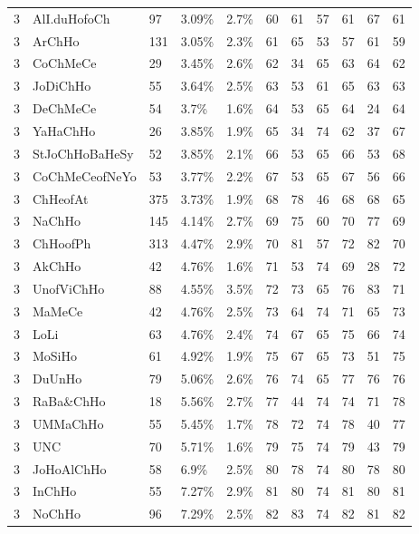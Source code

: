 \begin{longtable}{lllllrrrrrr}
  3 & AlI.duHofoCh & 97 & 3.09\% & 2.7\% &  60 &  61 &  57 &  61 &  67 &  61 \\ 
  3 & ArChHo & 131 & 3.05\% & 2.3\% &  61 &  65 &  53 &  57 &  61 &  59 \\ 
  3 & CoChMeCe & 29 & 3.45\% & 2.6\% &  62 &  34 &  65 &  63 &  64 &  62 \\ 
  3 & JoDiChHo & 55 & 3.64\% & 2.5\% &  63 &  53 &  61 &  65 &  63 &  63 \\ 
  3 & DeChMeCe & 54 & 3.7\% & 1.6\% &  64 &  53 &  65 &  64 &  24 &  64 \\ 
  3 & YaHaChHo & 26 & 3.85\% & 1.9\% &  65 &  34 &  74 &  62 &  37 &  67 \\ 
  3 & StJoChHoBaHeSy & 52 & 3.85\% & 2.1\% &  66 &  53 &  65 &  66 &  53 &  68 \\ 
  3 & CoChMeCeofNeYo & 53 & 3.77\% & 2.2\% &  67 &  53 &  65 &  67 &  56 &  66 \\ 
  3 & ChHeofAt & 375 & 3.73\% & 1.9\% &  68 &  78 &  46 &  68 &  68 &  65 \\ 
  3 & NaChHo & 145 & 4.14\% & 2.7\% &  69 &  75 &  60 &  70 &  77 &  69 \\ 
  3 & ChHoofPh & 313 & 4.47\% & 2.9\% &  70 &  81 &  57 &  72 &  82 &  70 \\ 
  3 & AkChHo & 42 & 4.76\% & 1.6\% &  71 &  53 &  74 &  69 &  28 &  72 \\ 
  3 & UnofViChHo & 88 & 4.55\% & 3.5\% &  72 &  73 &  65 &  76 &  83 &  71 \\ 
  3 & MaMeCe & 42 & 4.76\% & 2.5\% &  73 &  64 &  74 &  71 &  65 &  73 \\ 
  3 & LoLi & 63 & 4.76\% & 2.4\% &  74 &  67 &  65 &  75 &  66 &  74 \\ 
  3 & MoSiHo & 61 & 4.92\% & 1.9\% &  75 &  67 &  65 &  73 &  51 &  75 \\ 
  3 & DuUnHo & 79 & 5.06\% & 2.6\% &  76 &  74 &  65 &  77 &  76 &  76 \\ 
  3 & RaBa\&ChHo & 18 & 5.56\% & 2.7\% &  77 &  44 &  74 &  74 &  71 &  78 \\ 
  3 & UMMaChHo & 55 & 5.45\% & 1.7\% &  78 &  72 &  74 &  78 &  40 &  77 \\ 
  3 & UNC & 70 & 5.71\% & 1.6\% &  79 &  75 &  74 &  79 &  43 &  79 \\ 
  3 & JoHoAlChHo & 58 & 6.9\% & 2.5\% &  80 &  78 &  74 &  80 &  78 &  80 \\ 
  3 & InChHo & 55 & 7.27\% & 2.9\% &  81 &  80 &  74 &  81 &  80 &  81 \\ 
  3 & NoChHo & 96 & 7.29\% & 2.5\% &  82 &  83 &  74 &  82 &  81 &  82 \\ 

\end{longtable}

